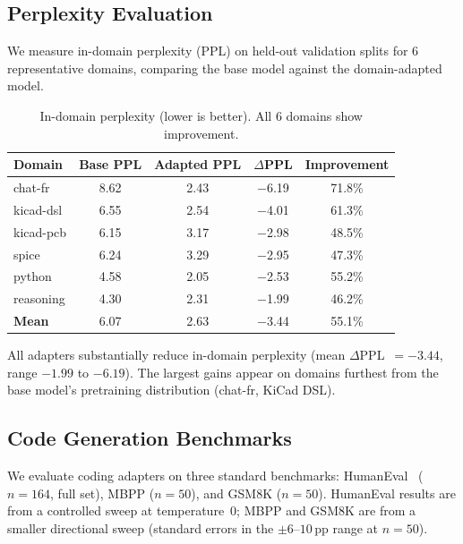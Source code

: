 \documentclass[11pt,a4paper]{article}
\begin{document}
\subsection{Perplexity Evaluation}

We measure in-domain perplexity (PPL) on held-out validation splits for 6 representative domains, comparing the base model against the domain-adapted model.

\begin{table}[h]
\centering
\caption{In-domain perplexity (lower is better). All 6 domains show improvement.}
\label{tab:ppl}
\begin{tabular}{lcccc}
\toprule
\textbf{Domain} & \textbf{Base PPL} & \textbf{Adapted PPL} & \textbf{$\Delta$PPL} & \textbf{Improvement} \\
\midrule
chat-fr & 8.62 & 2.43 & $-$6.19 & 71.8\% \\
kicad-dsl & 6.55 & 2.54 & $-$4.01 & 61.3\% \\
kicad-pcb & 6.15 & 3.17 & $-$2.98 & 48.5\% \\
spice & 6.24 & 3.29 & $-$2.95 & 47.3\% \\
python & 4.58 & 2.05 & $-$2.53 & 55.2\% \\
reasoning & 4.30 & 2.31 & $-$1.99 & 46.2\% \\
\midrule
\textbf{Mean} & 6.07 & 2.63 & $-$3.44 & 55.1\% \\
\bottomrule
\end{tabular}
\end{table}

All adapters substantially reduce in-domain perplexity (mean $\Delta$PPL~$= -3.44$, range $-1.99$ to $-6.19$). The largest gains appear on domains furthest from the base model's pretraining distribution (chat-fr, KiCad DSL).

\subsection{Code Generation Benchmarks}

We evaluate coding adapters on three standard benchmarks: HumanEval~\citep{chen2021evaluating} ($n{=}164$, full set), MBPP ($n{=}50$), and GSM8K ($n{=}50$). HumanEval results are from a controlled sweep at temperature~0; MBPP and GSM8K are from a smaller directional sweep (standard errors in the $\pm 6$--$10$\,pp range at $n{=}50$).
\end{document}
